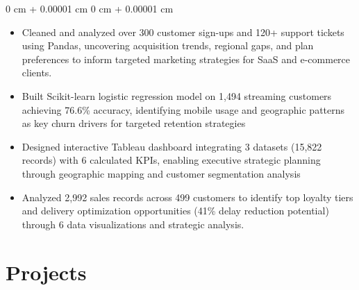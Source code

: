 \documentclass[10pt, a4paper]{article}
\newenvironment{highlights}{
    \begin{itemize}[
        topsep=0.10 cm,
        parsep=0.10 cm,
        partopsep=0pt,
        itemsep=0pt,
        leftmargin=20pt
    ]
}{
    \end{itemize}
} %
\newenvironment{onecolentry}{
    \begin{adjustwidth}{
        0 cm + 0.00001 cm
    }{
        0 cm + 0.00001 cm
    }
}{
    \end{adjustwidth}
} %
\newenvironment{twocolentry}[2][]{
    \onecolentry
    \def\secondColumn{#2}
    \setcolumnwidth{\fill, 4.5 cm}
    \begin{paracol}{2}
}{
    \switchcolumn \raggedleft \secondColumn
    \end{paracol}
    \endonecolentry
} %
\begin{document}
    \vspace{0.10 cm}
    \begin{onecolentry}
        \begin{highlights}
            \item Cleaned and analyzed over 300 customer sign-ups and 120+ support tickets using Pandas, uncovering acquisition trends, regional gaps, and plan preferences to inform targeted marketing strategies for SaaS and e-commerce clients.
            \item Built Scikit-learn logistic regression model on 1,494 streaming customers achieving 76.6\% accuracy, identifying mobile usage and geographic patterns as key churn drivers for targeted retention strategies
            \item Designed interactive Tableau dashboard integrating 3 datasets (15,822 records) with 6 calculated KPIs, enabling executive strategic planning through geographic mapping and customer segmentation analysis
            \item Analyzed 2,992 sales records across 499 customers to identify top loyalty tiers and delivery optimization opportunities (41\% delay reduction potential) through 6 data visualizations and strategic analysis.
        \end{highlights}
    \end{onecolentry}

    \vspace{0.15 cm}

    \section{Projects}


\end{document}
